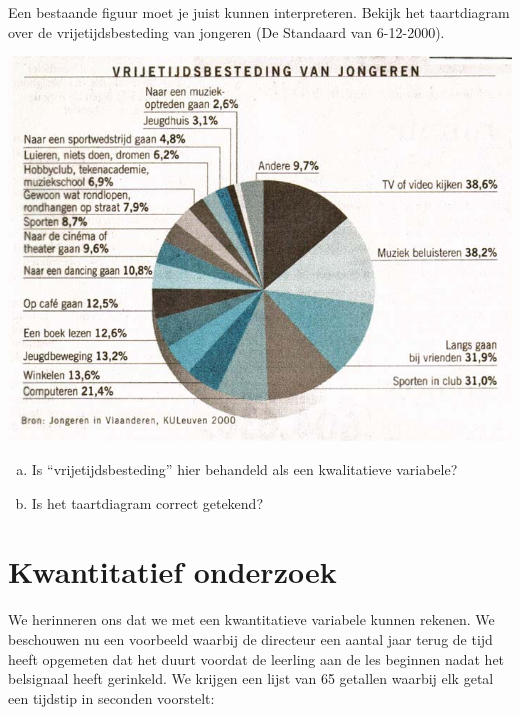 \documentclass[12pt,twoside,a4paper]{article}
\begin{document}
\begin{oefening}
Een bestaande figuur moet je juist kunnen interpreteren. Bekijk het taartdiagram over de
vrijetijdsbesteding van jongeren (De Standaard van 6-12-2000).

\begin{center}
  \includegraphics[width=1\textwidth]{cirkeldiagram-vrijetijdsbesteding}
\end{center}

\begin{enumerate}[(a)]
  \item Is “vrijetijdsbesteding” hier behandeld als een kwalitatieve variabele?
  \item Is het taartdiagram correct getekend?
\end{enumerate}
\end{oefening}

\cleardoublepage
\section{Kwantitatief onderzoek}

We herinneren ons dat we met een kwantitatieve variabele kunnen rekenen. We beschouwen nu een voorbeeld waarbij de directeur een aantal jaar terug de tijd heeft opgemeten dat het duurt voordat de leerling aan de les beginnen nadat het belsignaal heeft gerinkeld. We krijgen een lijst van 65 getallen waarbij elk getal een tijdstip in seconden voorstelt:

\end{document}
